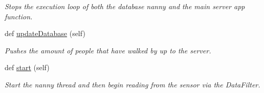 \begin{DoxyCompactItemize}
\begin{DoxyCompactList}\small\item\em Stops the execution loop of both the database nanny and the main server app function. \end{DoxyCompactList}\item 
def \mbox{\hyperlink{class_server_app_1_1_server_app_a648c098cf7d409cceb017a196b1d0db3}{update\+Database}} (self)
\begin{DoxyCompactList}\small\item\em Pushes the amount of people that have walked by up to the server. \end{DoxyCompactList}\item 
def \mbox{\hyperlink{class_server_app_1_1_server_app_a847d2ab7b7c525f897d710859f363ab5}{start}} (self)
\begin{DoxyCompactList}\small\item\em Start the nanny thread and then begin reading from the sensor via the Data\+Filter. \end{DoxyCompactList}\end{DoxyCompactItemize}
